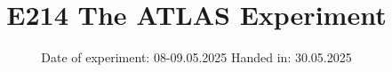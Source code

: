 

\subject{}
\title{E214
The ATLAS Experiment}
\date{%
  Date of experiment: 08-09.05.2025
  \hspace{3em}
  Handed in: 30.05.2025
}



\maketitle
\thispagestyle{empty}
\tableofcontents
\newpage




\appendix


\nocite{*}
\printbibliography{}



